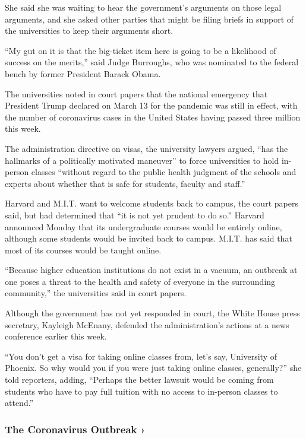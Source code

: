 She said she was waiting to hear the government's arguments on those
legal arguments, and she asked other parties that might be filing briefs
in support of the universities to keep their arguments short.

``My gut on it is that the big-ticket item here is going to be a
likelihood of success on the merits,'' said Judge Burroughs, who was
nominated to the federal bench by former President Barack Obama.

The universities noted in court papers that the national emergency that
President Trump declared on March 13 for the pandemic was still in
effect, with the number of coronavirus cases in the United States having
passed three million this week.

The administration directive on visas, the university lawyers argued,
``has the hallmarks of a politically motivated maneuver'' to force
universities to hold in-person classes ``without regard to the public
health judgment of the schools and experts about whether that is safe
for students, faculty and staff.''

Harvard and M.I.T. want to welcome students back to campus, the court
papers said, but had determined that ``it is not yet prudent to do so.''
Harvard announced Monday that its undergraduate courses would be
entirely online, although some students would be invited back to campus.
M.I.T. has said that most of its courses would be taught online.

``Because higher education institutions do not exist in a vacuum, an
outbreak at one poses a threat to the health and safety of everyone in
the surrounding community,'' the universities said in court papers.

Although the government has not yet responded in court, the White House
press secretary, Kayleigh McEnany, defended the administration's actions
at a news conference earlier this week.

``You don't get a visa for taking online classes from, let's say,
University of Phoenix. So why would you if you were just taking online
classes, generally?'' she told reporters, adding, ``Perhaps the better
lawsuit would be coming from students who have to pay full tuition with
no access to in-person classes to attend.''

\href{https://www.nytimes.com/news-event/coronavirus?action=click\&pgtype=Article\&state=default\&region=MAIN_CONTENT_3\&context=storylines_faq}{}

\hypertarget{the-coronavirus-outbreak-}{%
\subsubsection{The Coronavirus Outbreak
›}\label{the-coronavirus-outbreak-}}

